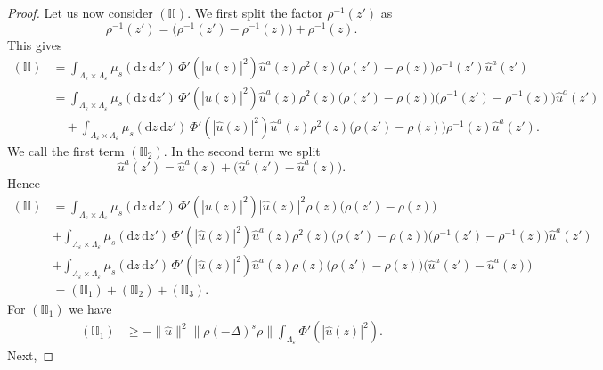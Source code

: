 \documentclass{article}
\numberwithin{equation}{section}
\newcommand{\mathd}{\mathrm{d}}
\theoremstyle{plain}
\theoremstyle{definition}
\begin{document}
\begin{proof}
  Let us now consider $(\mathbb{I}\mathbb{I})$. We first split the factor
  \(\rho^{-1}(z')\) as
  \[
  \rho^{-1}(z')
  =
  \bigl(\rho^{-1}(z')-\rho^{-1}(z)\bigr)
  +
  \rho^{-1}(z).
  \]
  This gives
  \begin{align*}
  	(\mathbb{I}\mathbb{I})
  	&=
  	\int_{\Lambda_{\varepsilon}\times\Lambda_{\varepsilon}}
  	\mu_s(\mathd z\,\mathd z')\,
  	\Phi'(|\hat u(z)|^2)
  	\hat u^a(z)\rho^2(z)
  	\bigl(\rho(z')-\rho(z)\bigr)\rho^{-1}(z')\hat u^a(z')
  	\\
  	&=
  	\int_{\Lambda_{\varepsilon}\times\Lambda_{\varepsilon}}
  	\mu_s(\mathd z\,\mathd z')\,
  	\Phi'(|\hat u(z)|^2)
  	\hat u^a(z)\rho^2(z)
  	\bigl(\rho(z')-\rho(z)\bigr)
  	\bigl(\rho^{-1}(z')-\rho^{-1}(z)\bigr)\hat u^a(z')
  	\\
  	&\quad
  	+
  	\int_{\Lambda_{\varepsilon}\times\Lambda_{\varepsilon}}
  	\mu_s(\mathd z\,\mathd z')\,
  	\Phi'(|\hat u(z)|^2)
  	\hat u^a(z)\rho^2(z)
  	\bigl(\rho(z')-\rho(z)\bigr)\rho^{-1}(z)\hat u^a(z').
  \end{align*}
  We call the first term \((\mathbb{I}\mathbb{I}_2)\). In the second term we
  split
  \[
  \hat u^a(z')
  =
  \hat u^a(z)
  +
  \bigl(\hat u^a(z')-\hat u^a(z)\bigr).
  \]
  Hence
  \begin{align*}
  	(\mathbb{I}\mathbb{I})
  	&=
  	\int_{\Lambda_{\varepsilon}\times\Lambda_{\varepsilon}}
  	\mu_s(\mathd z\,\mathd z')\,
  	\Phi'(|\hat u(z)|^2)
  	|\hat u(z)|^2\rho(z)
  	\bigl(\rho(z')-\rho(z)\bigr)
  	\\
  	&
  	+
  	\int_{\Lambda_{\varepsilon}\times\Lambda_{\varepsilon}}
  	\mu_s(\mathd z\,\mathd z')\,
  	\Phi'(|\hat u(z)|^2)
  	\hat u^a(z)\rho^2(z)
  	\bigl(\rho(z')-\rho(z)\bigr)
  	\bigl(\rho^{-1}(z')-\rho^{-1}(z)\bigr)\hat u^a(z')
  	\\
  	&
  	+
  	\int_{\Lambda_{\varepsilon}\times\Lambda_{\varepsilon}}
  	\mu_s(\mathd z\,\mathd z')\,
  	\Phi'(|\hat u(z)|^2)
  	\hat u^a(z)\rho(z)
  	\bigl(\rho(z')-\rho(z)\bigr)
  	\bigl(\hat u^a(z')-\hat u^a(z)\bigr)
  	\\
  	&=
  	(\mathbb{I}\mathbb{I}_1)
  	+
  	(\mathbb{I}\mathbb{I}_2)
  	+
  	(\mathbb{I}\mathbb{I}_3).
  \end{align*}
  For $(\mathbb{I}\mathbb{I}_1)$ we have
  \[ \begin{aligned}
       (\mathbb{I}\mathbb{I}_1) & \geqslant  - \| \hat{u} \|^2  \| \rho (-
       \Delta)^s \rho \|  \int_{\Lambda_{\varepsilon}} \Phi' (| \hat{u} (z)
       |^2) .
     \end{aligned} \]
  Next,

\end{proof}
\end{document}
